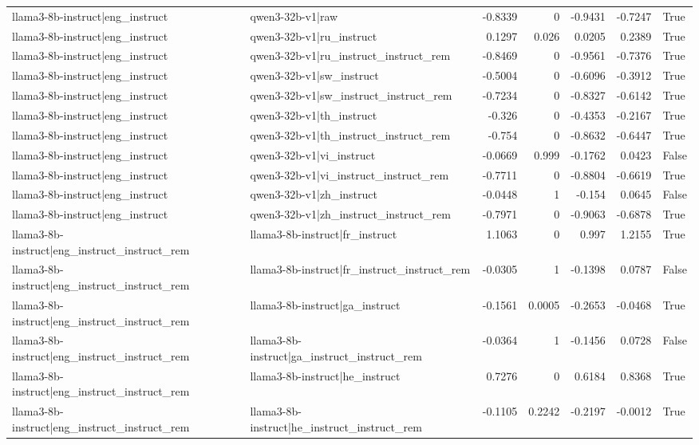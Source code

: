 \begin{table}
\begin{tabular}{l l r r r r l}
llama3-8b-instruct|eng_instruct & qwen3-32b-v1|raw & -0.8339 & 0 & -0.9431 & -0.7247 & True \\
llama3-8b-instruct|eng_instruct & qwen3-32b-v1|ru_instruct & 0.1297 & 0.026 & 0.0205 & 0.2389 & True \\
llama3-8b-instruct|eng_instruct & qwen3-32b-v1|ru_instruct_instruct_rem & -0.8469 & 0 & -0.9561 & -0.7376 & True \\
llama3-8b-instruct|eng_instruct & qwen3-32b-v1|sw_instruct & -0.5004 & 0 & -0.6096 & -0.3912 & True \\
llama3-8b-instruct|eng_instruct & qwen3-32b-v1|sw_instruct_instruct_rem & -0.7234 & 0 & -0.8327 & -0.6142 & True \\
llama3-8b-instruct|eng_instruct & qwen3-32b-v1|th_instruct & -0.326 & 0 & -0.4353 & -0.2167 & True \\
llama3-8b-instruct|eng_instruct & qwen3-32b-v1|th_instruct_instruct_rem & -0.754 & 0 & -0.8632 & -0.6447 & True \\
llama3-8b-instruct|eng_instruct & qwen3-32b-v1|vi_instruct & -0.0669 & 0.999 & -0.1762 & 0.0423 & False \\
llama3-8b-instruct|eng_instruct & qwen3-32b-v1|vi_instruct_instruct_rem & -0.7711 & 0 & -0.8804 & -0.6619 & True \\
llama3-8b-instruct|eng_instruct & qwen3-32b-v1|zh_instruct & -0.0448 & 1 & -0.154 & 0.0645 & False \\
llama3-8b-instruct|eng_instruct & qwen3-32b-v1|zh_instruct_instruct_rem & -0.7971 & 0 & -0.9063 & -0.6878 & True \\
llama3-8b-instruct|eng_instruct_instruct_rem & llama3-8b-instruct|fr_instruct & 1.1063 & 0 & 0.997 & 1.2155 & True \\
llama3-8b-instruct|eng_instruct_instruct_rem & llama3-8b-instruct|fr_instruct_instruct_rem & -0.0305 & 1 & -0.1398 & 0.0787 & False \\
llama3-8b-instruct|eng_instruct_instruct_rem & llama3-8b-instruct|ga_instruct & -0.1561 & 0.0005 & -0.2653 & -0.0468 & True \\
llama3-8b-instruct|eng_instruct_instruct_rem & llama3-8b-instruct|ga_instruct_instruct_rem & -0.0364 & 1 & -0.1456 & 0.0728 & False \\
llama3-8b-instruct|eng_instruct_instruct_rem & llama3-8b-instruct|he_instruct & 0.7276 & 0 & 0.6184 & 0.8368 & True \\
llama3-8b-instruct|eng_instruct_instruct_rem & llama3-8b-instruct|he_instruct_instruct_rem & -0.1105 & 0.2242 & -0.2197 & -0.0012 & True \\

\end{tabular}
\end{table}
